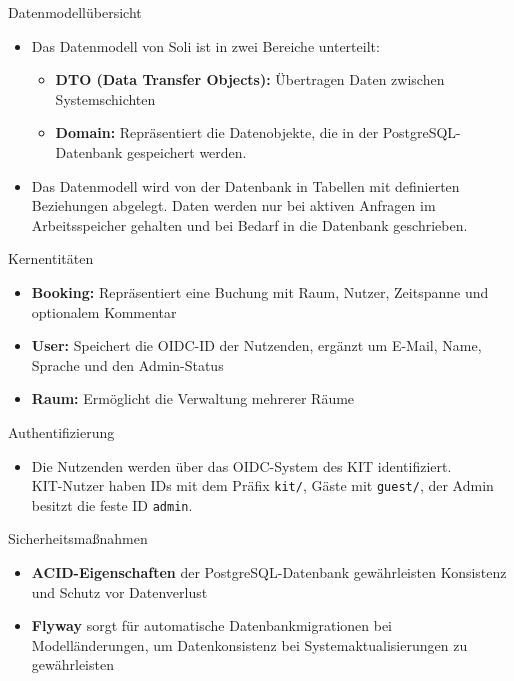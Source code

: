 \documentclass{sdqbeamer}
\begin{document}
\begin{frame}{Datenmodellübersicht}
    \begin{itemize}
        \item Das Datenmodell von Soli ist in zwei Bereiche unterteilt:
        \begin{itemize}
            \item \textbf{DTO (Data Transfer Objects):} Übertragen Daten zwischen Systemschichten
            \item \textbf{Domain:} Repräsentiert die Datenobjekte, die in der PostgreSQL-Datenbank gespeichert werden.
        \end{itemize}
        \item Das Datenmodell wird von der Datenbank in Tabellen mit definierten Beziehungen abgelegt. Daten werden nur bei aktiven Anfragen im Arbeitsspeicher gehalten und bei Bedarf in die Datenbank geschrieben.
    \end{itemize}
\end{frame}

\begin{frame}{Kernentitäten}
    \begin{itemize}
        \item \textbf{Booking:} Repräsentiert eine Buchung mit Raum, Nutzer, Zeitspanne und optionalem Kommentar
        \item \textbf{User:} Speichert die OIDC-ID der Nutzenden, ergänzt um E-Mail, Name, Sprache und den Admin-Status
        \item \textbf{Raum:} Ermöglicht die Verwaltung mehrerer Räume
    \end{itemize}
\end{frame}

\begin{frame}{Authentifizierung}
    \begin{itemize}
        \item Die Nutzenden werden über das OIDC-System des KIT identifiziert.\\ KIT-Nutzer haben IDs mit dem Präfix \texttt{kit/}, Gäste mit \texttt{guest/}, der Admin besitzt die feste ID \texttt{admin}.
    \end{itemize}
\end{frame}

\begin{frame}{Sicherheitsmaßnahmen}
    \begin{itemize}
        \item \textbf{ACID-Eigenschaften} der PostgreSQL-Datenbank gewährleisten Konsistenz und Schutz vor Datenverlust
        \item \textbf{Flyway} sorgt für automatische Datenbankmigrationen bei Modelländerungen, um Datenkonsistenz bei Systemaktualisierungen zu gewährleisten
    \end{itemize}
\end{frame}
\end{document}

